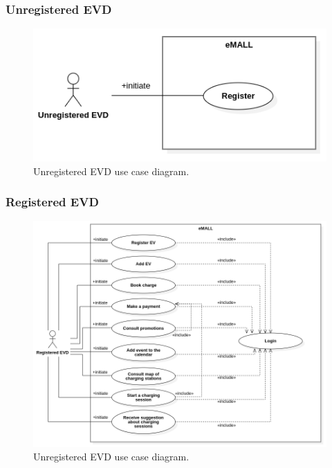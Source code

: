 \subsubsection*{Unregistered EVD}
\begin{figure} [H]
    \begin{center}
        \includegraphics[width=0.9\linewidth]{Images/UseCaseDiagrams/unregistered_EVD_use_case_diagram}
        \caption{Unregistered EVD use case diagram.}
        \label{fig: unregistered_EVD_diag}
    \end{center}
\end{figure}

\subsubsection*{Registered EVD}
\begin{figure} [H]
    \begin{center}
        \includegraphics[width=0.9\linewidth]{Images/UseCaseDiagrams/registered_EVD_use_case_diagram}
        \caption{Unregistered EVD use case diagram.}
        \label{fig: reg_EVD_diag}
    \end{center}
\end{figure}

